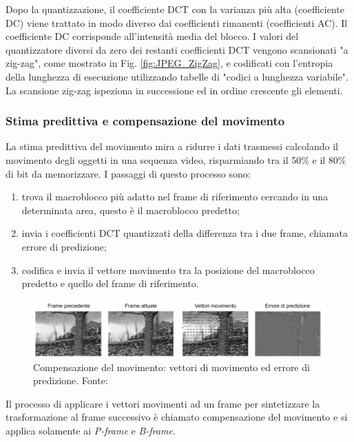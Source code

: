 Dopo la quantizzazione, il coefficiente DCT con la varianza più alta (coefficiente DC) viene trattato in modo diverso dai coefficienti rimanenti (coefficienti AC). Il coefficiente DC corrisponde all'intensità media del blocco. I valori del quantizzatore diversi da zero dei restanti coefficienti DCT vengono scansionati "a zig-zag", come mostrato in Fig. \ref{fig:JPEG_ZigZag}, e codificati con l'entropia della lunghezza di esecuzione utilizzando tabelle di "codici a lunghezza variabile". La scansione zig-zag ispeziona in successione ed in ordine crescente gli elementi.



\subsubsection{Stima predittiva e compensazione del movimento}
La stima predittiva del movimento mira a ridurre i dati trasmessi calcolando il movimento degli oggetti in una sequenza video, risparmiando tra il 50\% e il 80\% di bit da memorizzare. I passaggi di questo processo sono:

\begin{enumerate}
	\item trova il macroblocco più adatto nel frame di riferimento cercando in una determinata area, questo è il macroblocco predetto;
	\item invia i coefficienti DCT quantizzati della differenza tra i due frame, chiamata errore di predizione;
	\item codifica e invia il vettore movimento tra la posizione del macroblocco predetto e quello del frame di riferimento.
\end{enumerate}

\begin{figure}[H]
	\includegraphics[width=\linewidth]{immagini/motioncompensation}
	\caption{Compensazione del movimento: vettori di movimento ed errore di predizione. Fonte: }
	\label{fig:motioncompensation}
\end{figure}

Il processo di applicare i vettori movimenti ad un frame per sintetizzare la trasformazione al frame successivo è chiamato compensazione del movimento e si applica solamente ai \textit{P-frame} e \textit{B-frame}. 

